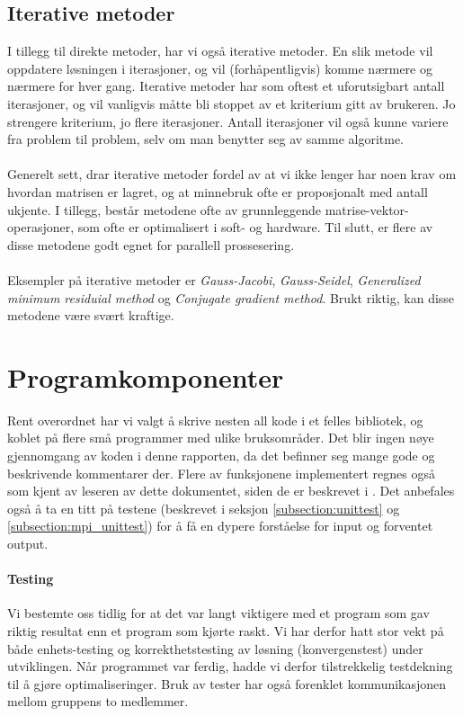 \documentclass{article}
\begin{document}
\subsection{Iterative metoder}
I tillegg til direkte metoder, har vi også iterative metoder. En slik metode vil oppdatere løsningen i iterasjoner, og vil (forhåpentligvis) komme nærmere og nærmere for hver gang. Iterative metoder har som oftest et uforutsigbart antall iterasjoner, og vil vanligvis måtte bli stoppet av et kriterium gitt av brukeren. Jo strengere kriterium, jo flere iterasjoner. Antall iterasjoner vil også kunne variere fra problem til problem, selv om man benytter seg av samme algoritme.\\
\\
Generelt sett, drar iterative metoder fordel av at vi ikke lenger har noen krav om hvordan matrisen er lagret, og at minnebruk ofte er proposjonalt med antall ukjente. I tillegg, består metodene ofte av grunnleggende matrise-vektor-operasjoner, som ofte er optimalisert i soft- og hardware. Til slutt, er flere av disse metodene godt egnet for parallell prossesering. \\
\\
Eksempler på iterative metoder er \emph{Gauss-Jacobi}, \emph{Gauss-Seidel}, \emph{Generalized minimum residuial method} og \emph{Conjugate gradient method}. Brukt riktig, kan disse metodene være svært kraftige.

\section{Programkomponenter}
Rent overordnet har vi valgt å skrive nesten all kode i et felles bibliotek, og koblet på flere små programmer med ulike bruksområder. Det blir ingen nøye gjennomgang av koden i denne rapporten, da det befinner seg mange gode og beskrivende kommentarer der. Flere av funksjonene implementert regnes også som kjent av leseren av dette dokumentet, siden de er beskrevet i \cite{fast-poisson}. Det anbefales også å ta en titt på testene (beskrevet i seksjon \ref{subsection:unittest} og \ref{subsection:mpi_unittest}) for å få en dypere forståelse for input og forventet output.

\paragraph{Testing}
Vi bestemte oss tidlig for at det var langt viktigere med et program som gav riktig resultat enn et program som kjørte raskt. Vi har derfor hatt stor vekt på både enhets-testing og korrekthetstesting av løsning (konvergenstest) under utviklingen. Når programmet var ferdig, hadde vi derfor tilstrekkelig testdekning til å gjøre optimaliseringer. Bruk av tester har også forenklet kommunikasjonen mellom gruppens to medlemmer.
\end{document}
